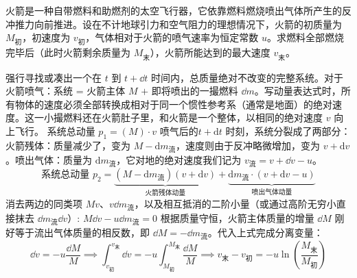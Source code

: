 \documentclass[lang=cn,11pt]{elegantbook}
\begin{document}
\begin{example}
火箭是一种自带燃料和助燃剂的太空飞行器，它依靠燃料燃烧喷出气体所产生的反冲推力向前推进。设在不计地球引力和空气阻力的理想情况下，火箭的初质量为 $M_{\text{初}}$，初速度为 $v_{\text{初}}$，气体相对于火箭的喷气速率为恒定常数 $u$。求燃料全部燃烧完毕后（此时火箭剩余质量为 $M_{\text{末}}$），火箭所能达到的最大速度 $v_{\text{末}}$。
\end{example}
\begin{solution}
强行寻找或凑出一个在 $t$ 到 $t+\dd t$ 时间内，总质量绝对不改变的完整系统。对于火箭喷气：系统 = 火箭主体 $M$ $+$ 即将喷出的一撮燃料 $\dd m$。写动量表达式时，所有物体的速度必须全部转换成相对于同一个惯性参考系（通常是地面）的绝对速度。这一小撮燃料还在火箭肚子里，和火箭是一个整体，以相同的绝对速度 $v$ 向上飞行。 \(\text{系统总动量 } p_1 = (M) \cdot v\) 
喷气后的$t+\mathrm{d}t$ 时刻，系统分裂成了两部分：火箭残体：质量减少了，变为 $M - \mathrm{d}m_{\text{流}}$，速度则由于反冲略微增加，变为 $v + \mathrm{d}v$。喷出气体：质量为 $\mathrm{d}m_{\text{流}}$，它对地的绝对速度我们记为 $v_{\text{流}}=v+\dd v-u$。
$$\text{系统总动量 } p_2 = \underbrace{(M - \mathrm{d}m_{\text{流}})(v + \mathrm{d}v)}_{\text{火箭残体动量}} + \underbrace{\mathrm{d}m_{\text{流}} \cdot (v+\mathrm{d} v-u)}_{\text{喷出气体动量}}$$
消去两边的同类项 $Mv$、$v\dd m_{\text{流}}$，以及相互抵消的二阶小量（或通过高阶无穷小直接抹去 $\dd m_{\text{流}}\dd v$）:
 \(M\dd v - u\dd m_{\text{流}} = 0\) 根据质量守恒，火箭主体质量的增量 $\dd M$ 刚好等于流出气体质量的相反数，即 $\dd M = -\dd m_{\text{流}}$。代入上式完成分离变量：
\[
\dd v = -u\frac{\dd M}{M}\implies
\int_{v_{\text{初}}}^{v_{\text{末}}} \dd v = -u \int_{M_{\text{初}}}^{M_{\text{末}}} \frac{\dd M}{M} \implies v_{\text{末}} - v_{\text{初}} = -u \ln\left(\frac{M_{\text{末}}}{M_{\text{初}}}\right)
\]
\end{solution}
\end{document}
